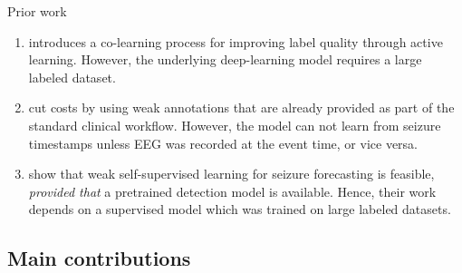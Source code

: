 \documentclass[t]{beamer}
\theoremstyle{definition}
\begin{document}
\begin{frame}{Prior work}
    \begin{enumerate}
    \item \citet{deiss2018efficient} introduces a co-learning process for improving label quality through active learning. However, the underlying deep-learning model requires a large labeled dataset.
    \item \citet{saab2020weak} cut costs by using weak annotations that are already provided as part of the standard clinical workflow. However, the model can not learn from seizure timestamps unless EEG was recorded at the event time, or vice versa.
    \item \citet{yang2022weak} show that weak self-supervised learning for seizure forecasting is feasible, \emph{provided that} a pretrained detection model is available. Hence, their work depends on a supervised model which was trained on large labeled datasets.
    \end{enumerate}


\end{frame}

\subsection{Main contributions}
\end{document}
